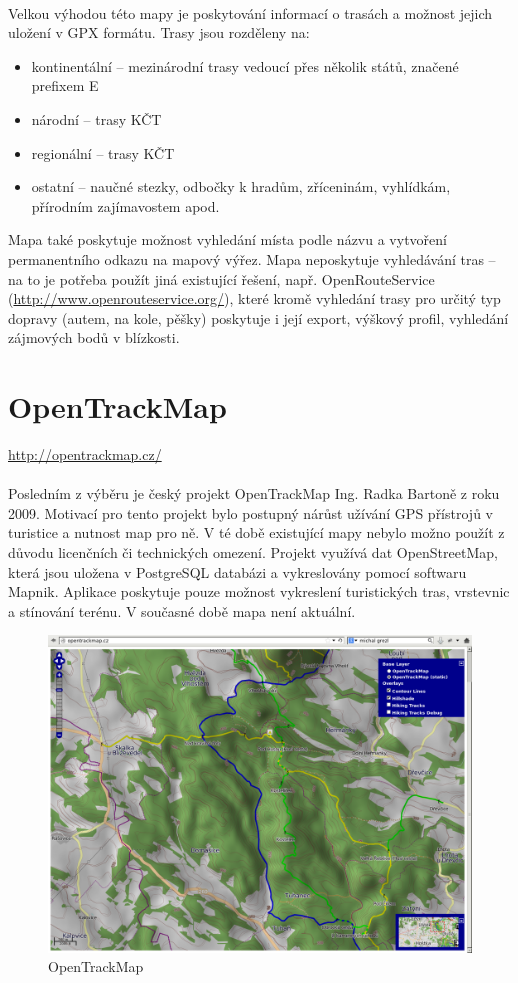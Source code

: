 \documentclass[11pt,a4paper,titlepage,oneside]{book}
\begin{document}
		\paragraph{} Velkou výhodou této mapy je poskytování informací o trasách a možnost jejich uložení v GPX formátu. Trasy jsou rozděleny na:
	\begin{itemize}
		 \item kontinentální -- mezinárodní trasy vedoucí přes několik států, značené prefixem E
		 \item národní -- trasy KČT
		 \item regionální -- trasy KČT
     		 \item ostatní -- naučné stezky, odbočky k hradům, zříceninám, vyhlídkám, přírodním zajímavostem apod.
	\end{itemize}
  Mapa také poskytuje možnost vyhledání místa podle názvu a vytvoření permanentního odkazu na mapový výřez. Mapa neposkytuje vyhledávání tras -- na to je potřeba použít jiná existující řešení, např. OpenRouteService (\url{http://www.openrouteservice.org/}), které kromě vyhledání trasy pro určitý typ dopravy (autem, na kole, pěšky) poskytuje i její export, výškový profil, vyhledání zájmových bodů v blízkosti.
 	\section{OpenTrackMap}
		\url{http://opentrackmap.cz/}
		\paragraph{} Posledním z výběru je český projekt OpenTrackMap Ing. Radka Bartoně z roku 2009. Motivací pro tento projekt bylo postupný nárůst užívání GPS přístrojů v turistice a nutnost map pro ně. V té době existující mapy nebylo možno použít z důvodu licenčních či technických omezení\cite{OTM}. Projekt využívá dat OpenStreetMap, která jsou uložena v PostgreSQL databázi a vykreslovány pomocí softwaru Mapnik. Aplikace poskytuje pouze možnost vykreslení turistických tras, vrstevnic a stínování terénu. V současné době mapa není aktuální.
		\begin{figure}[!h]
			\begin{center}
				\includegraphics[width=12cm]{obrazky/otm.png}
				\caption{OpenTrackMap}
			\end{center}
		\end{figure}
\end{document}
